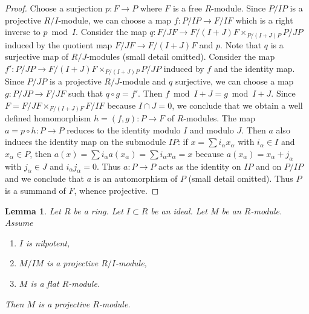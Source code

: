 \documentclass{amsart}
\theoremstyle{plain}
\newtheorem{lemma}[subsection]{Lemma}
\theoremstyle{definition}
\theoremstyle{remark}
\numberwithin{equation}{subsection}
\begin{document}
\begin{proof}
Choose a surjection $p : F \to P$ where $F$ is a free $R$-module.
Since $P/IP$ is a projective $R/I$-module, we can choose a map
$f : P/IP \to F/IF$ which is a right inverse to $p \bmod I$.
Consider the map $q : F/JF \to F/(I + J)F \times_{P/(I + J)P} P/JP$
induced by the quotient map $F/JF \to F/(I + J)F$ and $p$.
Note that $q$ is a surjective map of $R/J$-modules (small detail omitted).
Consider the map $f' : P/JP \to F/(I + J)F \times_{P/(I + J)P} P/JP$
induced by $f$ and the identity map.
Since $P/JP$ is a projective $R/J$-module and $q$ surjective,
we can choose a map $g : P/JP \to F/JF$ such that $q \circ g = f'$.
Then $f \bmod I + J = g \bmod I + J$. Since $F = F/JF \times_{F/(I + J)F} F/IF$
because $I \cap J = 0$, we conclude that we obtain a well defined homomorphism
$h = (f, g) : P \to F$ of $R$-modules. The map $a = p \circ h : P \to P$
reduces to the identity modulo $I$ and modulo $J$. Then $a$ also induces
the identity map on the submodule $IP$: if $x = \sum i_\alpha x_\alpha$
with $i_\alpha \in I$ and $x_\alpha \in P$, then
$a(x) = \sum i_\alpha a(x_\alpha) = \sum i_\alpha x_\alpha = x$
because $a(x_\alpha) = x_\alpha + j_\alpha$ with $j_\alpha \in J$
and $i_\alpha j_\alpha = 0$. Thus $a : P \to P$ acts as the identity
on $IP$ and on $P/IP$ and we conclude that $a$ is an automorphism of $P$
(small detail omitted). Thus $P$ is a summand of $F$, whence projective.
\end{proof}


\begin{lemma}
\label{algebra-lemma-lift-projective}
Let $R$ be a ring.
Let $I \subset R$ be an ideal.
Let $M$ be an $R$-module.
Assume
\begin{enumerate}
\item $I$ is nilpotent,
\item $M/IM$ is a projective $R/I$-module,
\item $M$ is a flat $R$-module.
\end{enumerate}
Then $M$ is a projective $R$-module.
\end{lemma}
\end{document}
